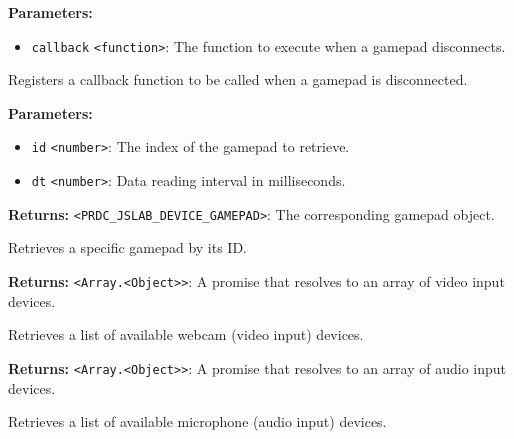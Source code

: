\documentclass[12pt,a4paper]{article}
\begin{document}
\noindent \textbf{Parameters:}
\begin{itemize}
  \item \texttt{callback} \texttt{<function>}: The function to execute when a gamepad disconnects.
\end{itemize}

\noindent Registers a callback function to be called when a gamepad is disconnected.

\vspace{5mm}
\noindent {}


\noindent \textbf{Parameters:}
\begin{itemize}
  \item \texttt{id} \texttt{<number>}: The index of the gamepad to retrieve.
  \item \texttt{dt} \texttt{<number>}: Data reading interval in milliseconds.
\end{itemize}

\noindent \textbf{Returns:} \texttt{<PRDC\_JSLAB\_DEVICE\_GAMEPAD>}: The corresponding gamepad object.

\noindent Retrieves a specific gamepad by its ID.

\vspace{5mm}
\noindent {}


\noindent \textbf{Returns:} \texttt{<Array.<Object>>}: A promise that resolves to an array of video input devices.

\noindent Retrieves a list of available webcam (video input) devices.

\vspace{5mm}
\noindent {}


\noindent \textbf{Returns:} \texttt{<Array.<Object>>}: A promise that resolves to an array of audio input devices.

\noindent Retrieves a list of available microphone (audio input) devices.

\vspace{5mm}
\noindent {}
\end{document}
